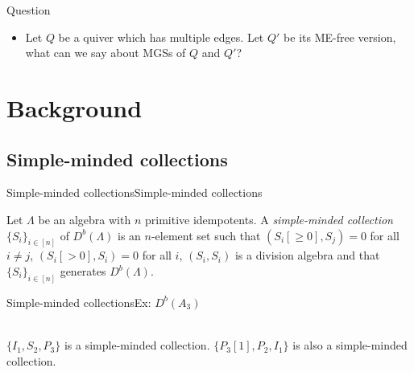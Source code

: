 \documentclass{beamer}
\begin{document}
\begin{frame}{Question}
\begin{itemize}
\item Let $Q$ be a quiver which has multiple edges. Let $Q'$ be its ME-free version, what can we say about MGSs of $Q$ and $Q'$?
\end{itemize}
\end{frame}

\section{Background}

\subsection{Simple-minded collections}
\begin{frame}{Simple-minded collections}{Simple-minded collections}
\begin{definition}
Let $\Lambda$ be an algebra with $n$ primitive idempotents. A \textit{simple-minded collection} $\{S_i\}_{i\in [n]}$ of $D^b(\Lambda)$ is an $n$-element set such that $(S_i[\geq 0],S_j)=0$ for all $i\neq j$, $(S_i[>0], S_i) = 0$ for all $i$, $(S_i,S_i)$ is a division algebra and that $\{S_i\}_{i\in [n]}$ generates $D^b(\Lambda)$.\\
\end{definition}
\end{frame}

\begin{frame}[fragile]{Simple-minded collections}{Ex: $D^b(A_3)$}
\\\pause
\indent $\{I_1, S_2, P_3\}$ is a simple-minded collection. $\{P_3[1], P_2, I_1\}$ is also a simple-minded collection.
\end{frame}
\end{document}
